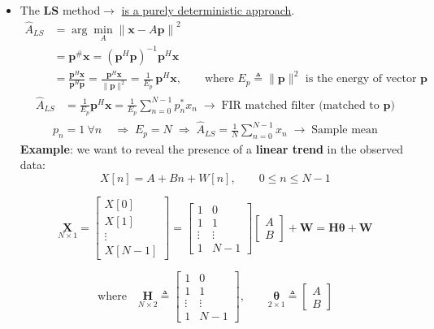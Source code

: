 \begin{itemize}
\item The \textbf{LS} method\(\rightarrow\) \underline{is a purely deterministic approach}.
\begin{align*}
\hat{A}_{LS}
&= \arg\min_{A} \left\| \mathbf{x} - A\mathbf{p} \right\|^{2} \\[4pt]
&= \mathbf{p}^{\#}\mathbf{x}
 = (\mathbf{p}^{H}\mathbf{p})^{-1}\mathbf{p}^{H}\mathbf{x} \\[4pt]
&= \frac{\mathbf{p}^{H}\mathbf{x}}{\mathbf{p}^{H}\mathbf{p}}
 = \frac{\mathbf{p}^{H}\mathbf{x}}{\lVert \mathbf{p} \rVert^{2}}
 = \frac{1}{E_{p}}\,\mathbf{p}^{H}\mathbf{x},
 \qquad \text{where } E_{p} \triangleq \lVert \mathbf{p} \rVert^{2}
 \text{ is the energy of vector } \mathbf{p}
\end{align*}
\vspace{-1.25em}
\begin{align*}
\hat{A}_{LS}
&= \frac{1}{E_{p}}\mathbf{p}^{H}\mathbf{x}
 = \frac{1}{E_{p}}\sum_{n=0}^{N-1} p_{n}^{*} x_{n}
 \;\longrightarrow\;
\text{FIR matched filter (matched to } \mathbf{p}\text{)}
\end{align*}
\vspace{-1.25em}
\begin{align*}
p_{n} = 1 \ \forall n
&\;\Rightarrow\;
E_{p} = N
\;\Rightarrow\;
\hat{A}_{LS}
 = \frac{1}{N}\sum_{n=0}^{N-1} x_{n}
 \;\longrightarrow\;
\text{Sample mean}
\end{align*}
\textbf{Example}: we want to reveal the presence of a \textbf{linear trend} in the observed data:
\[
X[n] = A + Bn + W[n], \qquad 0 \le n \le N-1
\]

\[
\underset{N \times 1}{\mathbf{X}}
=
\begin{bmatrix}
X[0] \\
X[1] \\
\vdots \\
X[N-1]
\end{bmatrix}
=
\begin{bmatrix}
1 & 0 \\
1 & 1 \\
\vdots & \vdots \\
1 & N-1
\end{bmatrix}
\begin{bmatrix}
A \\ B
\end{bmatrix}
+ \mathbf{W}
= \mathbf{H}\boldsymbol{\theta} + \mathbf{W}
\]

\[
\text{where}\quad
\underset{N \times 2}{\mathbf{H}} \triangleq
\begin{bmatrix}
1 & 0 \\
1 & 1 \\
\vdots & \vdots \\
1 & N-1
\end{bmatrix},
\qquad
\underset{2 \times 1}{\boldsymbol{\theta}} \triangleq
\begin{bmatrix}
A \\ B
\end{bmatrix}
\]


\end{itemize}
